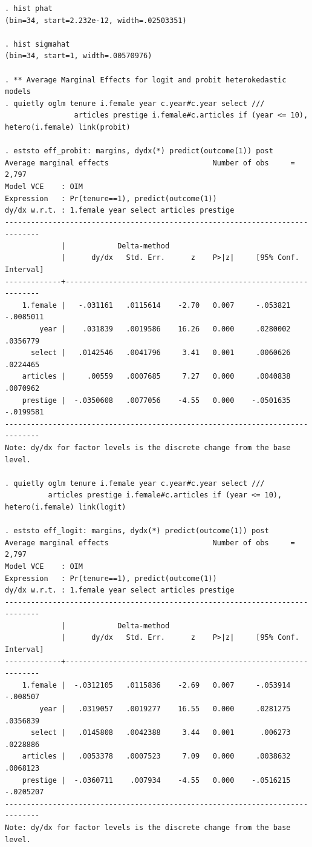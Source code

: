 \begin{verbatim}
. hist phat
(bin=34, start=2.232e-12, width=.02503351)

. hist sigmahat
(bin=34, start=1, width=.00570976)

. ** Average Marginal Effects for logit and probit heterokedastic models
. quietly oglm tenure i.female year c.year#c.year select ///
                articles prestige i.female#c.articles if (year <= 10), hetero(i.female) link(probit)

. eststo eff_probit: margins, dydx(*) predict(outcome(1)) post
Average marginal effects                        Number of obs     =      2,797
Model VCE    : OIM
Expression   : Pr(tenure==1), predict(outcome(1))
dy/dx w.r.t. : 1.female year select articles prestige
------------------------------------------------------------------------------
             |            Delta-method
             |      dy/dx   Std. Err.      z    P>|z|     [95% Conf. Interval]
-------------+----------------------------------------------------------------
    1.female |   -.031161   .0115614    -2.70   0.007     -.053821   -.0085011
        year |    .031839   .0019586    16.26   0.000     .0280002    .0356779
      select |   .0142546   .0041796     3.41   0.001     .0060626    .0224465
    articles |     .00559   .0007685     7.27   0.000     .0040838    .0070962
    prestige |  -.0350608   .0077056    -4.55   0.000    -.0501635   -.0199581
------------------------------------------------------------------------------
Note: dy/dx for factor levels is the discrete change from the base level.

. quietly oglm tenure i.female year c.year#c.year select ///
          articles prestige i.female#c.articles if (year <= 10), hetero(i.female) link(logit)

. eststo eff_logit: margins, dydx(*) predict(outcome(1)) post
Average marginal effects                        Number of obs     =      2,797
Model VCE    : OIM
Expression   : Pr(tenure==1), predict(outcome(1))
dy/dx w.r.t. : 1.female year select articles prestige
------------------------------------------------------------------------------
             |            Delta-method
             |      dy/dx   Std. Err.      z    P>|z|     [95% Conf. Interval]
-------------+----------------------------------------------------------------
    1.female |  -.0312105   .0115836    -2.69   0.007     -.053914    -.008507
        year |   .0319057   .0019277    16.55   0.000     .0281275    .0356839
      select |   .0145808   .0042388     3.44   0.001      .006273    .0228886
    articles |   .0053378   .0007523     7.09   0.000     .0038632    .0068123
    prestige |  -.0360711    .007934    -4.55   0.000    -.0516215   -.0205207
------------------------------------------------------------------------------
Note: dy/dx for factor levels is the discrete change from the base level.


\end{verbatim}
